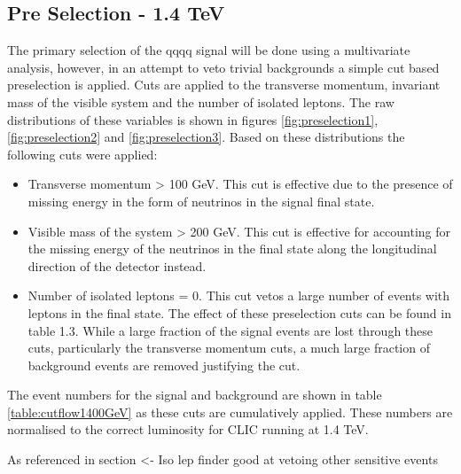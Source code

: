 \subsection{Pre Selection - 1.4 TeV}

The primary selection of the \nu{\nu}qqqq signal will be done using a multivariate analysis, however, in an attempt to veto trivial backgrounds a simple cut based preselection is applied. Cuts are applied to the transverse momentum, invariant mass of the visible system and the number of isolated leptons. The raw distributions of these variables is
shown in figures \ref{fig:preselection1}, \ref{fig:preselection2} and \ref{fig:preselection3}. Based on these distributions the following cuts were applied:

\begin{itemize}
\item Transverse momentum > 100 GeV. This cut is effective due to the presence of missing energy in the form of neutrinos in the signal final state.
\item Visible mass of the system > 200 GeV. This cut is effective for accounting for the missing energy of the neutrinos in the final state along the longitudinal direction of the detector instead.
\item Number of isolated leptons = 0. This cut vetos a large number of events with leptons in the final state.
The effect of these preselection cuts can be found in table 1.3. While a large fraction of the signal events are lost through these cuts, particularly the transverse momentum cuts, a much large fraction of background events are removed justifying the cut.
\end{itemize}

The event numbers for the signal and background are shown in table \ref{table:cutflow1400GeV} as these cuts are cumulatively applied.  These numbers are normalised to the correct luminosity for CLIC running at 1.4 TeV.  

As referenced in section  <- Iso lep finder good at vetoing other sensitive events 

